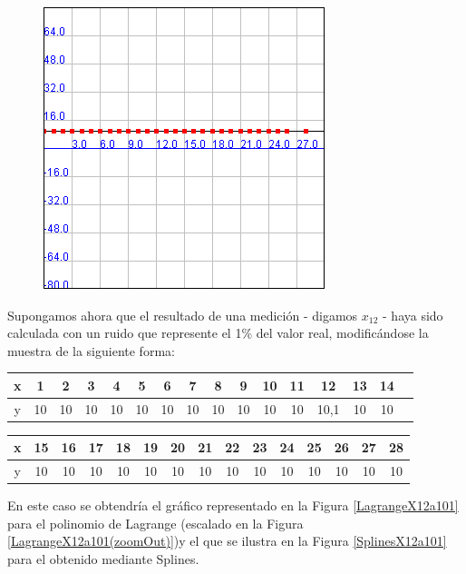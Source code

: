 \documentclass[a4paper]{article}
\begin{document}
\begin{figure}[h!]
	\caption{}
	\begin{center}
	\includegraphics[scale=1]{imagenes/LagrangeSplinesCTE}
	\label{LagrangeSplinesCTE}
  \end{center}
\end{figure}

Supongamos ahora que el resultado de una medición - digamos $x_{12}$ - haya sido calculada con un ruido que represente el 1\% del valor real, modificándose la muestra de la siguiente forma:\\

\smallskip

\begin{tabular}{ | c || c | c | c | c | c |c | c | c | c | c | c | c | c | c | c |}
 \hline                 
   x & 1 & 2 & 3 & 4 & 5 & 6 & 7 & 8 & 9 & 10 & 11 & 12 & 13 & 14 \\
 \hline    
y & 10 & 10& 10& 10& 10& 10& 10& 10& 10& 10& 10& 10,1& 10 & 10\\
 \hline  
 \end{tabular}

 \smallskip

\begin{tabular}{  | c || c | c | c | c | c | c | c | c | c | c | c | c | c | c | }
 \hline                 
   x&15& 16 & 17 & 18 & 19 & 20 & 21 & 22 & 23 & 24 & 25 & 26 & 27 & 28\\
 \hline    
y & 10 & 10 & 10& 10& 10& 10& 10& 10& 10& 10& 10& 10& 10& 10 \\
 \hline  
 \end{tabular}

\bigskip

 En este caso se obtendría el gráfico representado en la Figura \ref{LagrangeX12a101} para el polinomio de Lagrange (escalado en la Figura \ref{LagrangeX12a101(zoomOut)})y el que se ilustra en la Figura \ref{SplinesX12a101} para el obtenido mediante Splines.\\
\end{document}
